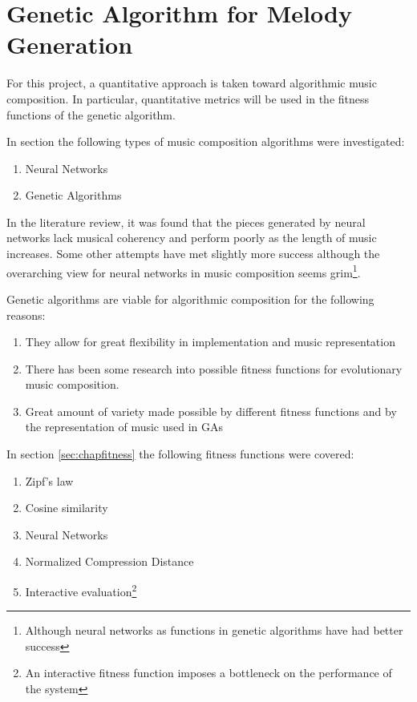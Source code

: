 


\chapter{Genetic Algorithm for Melody Generation}

For this project, a quantitative approach is taken toward algorithmic music composition. In particular, quantitative metrics will be used in the fitness functions of the genetic algorithm.

In section \label{chap:comp_algo} the following types of music composition algorithms were investigated:
\begin{enumerate}
\item Neural Networks
\item Genetic Algorithms
\end{enumerate}
In the literature review, it was found that the pieces generated by neural networks lack musical coherency and perform poorly as the length of music increases. Some other attempts have met slightly more success although the overarching view for neural networks in music composition seems grim\footnote{Although neural networks as functions in genetic algorithms have had better success}.

Genetic algorithms are viable for algorithmic composition for the following reasons:
\begin{enumerate}
\item They allow for great flexibility in implementation and music representation
\item There has been some research into possible fitness functions for evolutionary music composition.
\item Great amount of variety made possible by different fitness functions and by the representation of music used in \acp{GA}
\end{enumerate}

In section \ref{sec:chapfitness} the following fitness functions were covered:
\begin{enumerate}
\item Zipf's law
\item Cosine similarity
\item Neural Networks
\item Normalized Compression Distance
\item Interactive evaluation\footnote{An interactive fitness function imposes a bottleneck on the performance of the system}
\end{enumerate}

